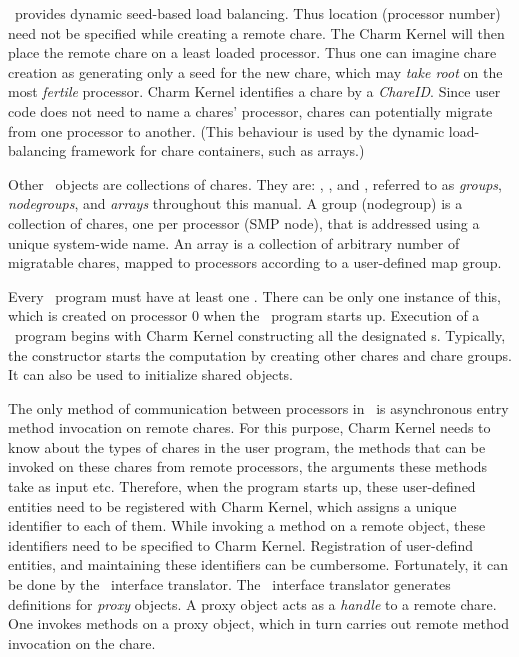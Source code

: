 \charmpp\ provides dynamic seed-based load balancing. Thus location (processor
number) need not be specified while creating a remote chare. The
Charm Kernel will then place the remote chare on a least loaded processor. Thus
one can imagine chare creation as generating only a seed for the new chare,
which may {\em take root} on the most {\em fertile} processor. Charm Kernel
identifies a chare by a {\em ChareID}.  Since user code does not
need to name a chares' processor, chares can potentially migrate from one
processor to another.  (This behaviour is used by the dynamic load-balancing
framework for chare containers, such as arrays.)

Other \charmpp\ objects are collections of chares. They are: , , and , referred to as {\em groups}, {\em nodegroups}, and {\em arrays}
throughout this manual. A group (nodegroup) is a collection of chares, one per
processor (SMP node), that is addressed using a unique system-wide name. An
array is a collection of arbitrary number of migratable chares, mapped to
processors according to a user-defined map group.

Every \charmpp\ program must have at least one .  There can be
only one instance of this, which is created on processor 0 when the \charmpp\
program starts up.  Execution of a \charmpp\ program begins with Charm Kernel
constructing all the designated s.  Typically, the \kw{mainchare}
constructor starts the computation by creating other chares and chare
\index{group} groups.  It can also be used to initialize shared 
objects.

The only method of communication between processors in \charmpp\ is
asynchronous \index{entry method} entry method invocation on remote chares. For
this purpose, Charm Kernel needs to know about the types of \index{chare}chares
in the user program, the methods that can be invoked on these chares from
remote processors, the arguments these methods take as input etc. Therefore,
when the program starts up, these user-defined entities need to be registered
with Charm Kernel, which assigns a unique identifier to each of them. While
invoking a method on a remote object, these identifiers need to be specified to
Charm Kernel. Registration of user-defind entities, and maintaining these
identifiers can be cumbersome. Fortunately, it can be done by the \charmpp\
interface translator. The \charmpp\ interface translator generates definitions
for {\em proxy} objects. A proxy object acts as a {\em handle} to a remote
chare. One invokes methods on a proxy object, which in turn carries out remote
method invocation on the chare.

